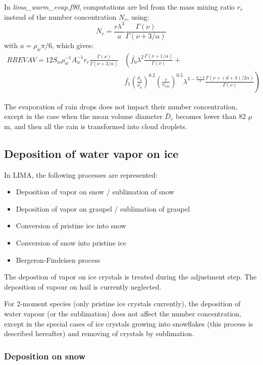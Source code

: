 {In \emph{lima\_warm\_evap.f90}, computations are led from the mass mixing ratio $r_r$ instead of the number concentration $N_r$, using:
\begin{equation}
 N_r = \frac{r \lambda^3}{a} \frac{\Gamma(\nu)}{\Gamma(\nu+3/\alpha)}
\end{equation}
with $a=\rho_w \pi / 6$, which gives:
\begin{align}
 RREVAV = 12 S_w \rho_w^{-1} A_w^{-1} r_r \frac{\Gamma(\nu)}{\Gamma(\nu+3/\alpha)} & \left( \bar{f_0} \lambda^2 \frac{\Gamma(\nu + 1 / \alpha)}{\Gamma(\nu)} + \right. \nonumber \\
 &\left. \bar{f_1} \left(\frac{\rho_0}{\rho_a}\right)^{0.2} \left(\frac{c}{\nu_{cin}}\right)^{0.5} \lambda^{3-\frac{d+3}{2}} \frac{\Gamma(\nu + (d+3)/2\alpha)}{\Gamma(\nu)} \right)
\end{align}

The evaporation of rain drops does not impact their number concentration, except in the case when the mean volume diameter $\bar{D}_r$ becomes lower than 82 $\mu$m, and then all the rain is transformed into cloud droplets.

\subsection{Deposition of water vapor on ice}

In LIMA, the following processes are represented:
\begin{itemize}
 \item Deposition of vapor on snow / sublimation of snow
 \item Deposition of vapor on graupel / sublimation of graupel
 \item Conversion of pristine ice into snow
 \item Conversion of snow into pristine ice
 \item Bergeron-Findeisen process
\end{itemize}
The depostion of vapor on ice crystals is treated during the adjustment step. The deposition of vapour on hail is currently neglected.

For 2-moment species (only pristine ice crystals currently), the deposition of water vapour (or the sublimation) does not affect the number concentration, except in the special cases of ice crystals growing into snowflakes (this process is described hereafter) and removing of crystals by sublimation.

\subsubsection{Deposition on snow}

}

